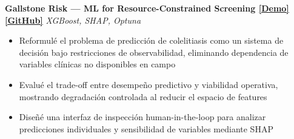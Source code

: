 \vspace{2pt}

\textbf{Gallstone Risk --- ML for Resource-Constrained Screening 
\enspace\href{\detokenize{https://gallstone.rosewt.dev/}}{[Demo]}
\enspace\href{\detokenize{https://github.com/R0SEWT/gallstone-risk-rural-peru-ml}}{[GitHub]}}
\hfill \textit{XGBoost, SHAP, Optuna}
\begin{itemize}[leftmargin=1.2em, itemsep=1pt, topsep=2pt]
\item Reformulé el problema de predicción de colelitiasis como un sistema de decisión bajo restricciones de observabilidad, eliminando dependencia de variables clínicas no disponibles en campo
\item Evalué el trade-off entre desempeño predictivo y viabilidad operativa, mostrando degradación controlada al reducir el espacio de features
\item Diseñé una interfaz de inspección human-in-the-loop para analizar predicciones individuales y sensibilidad de variables mediante SHAP
\end{itemize}
